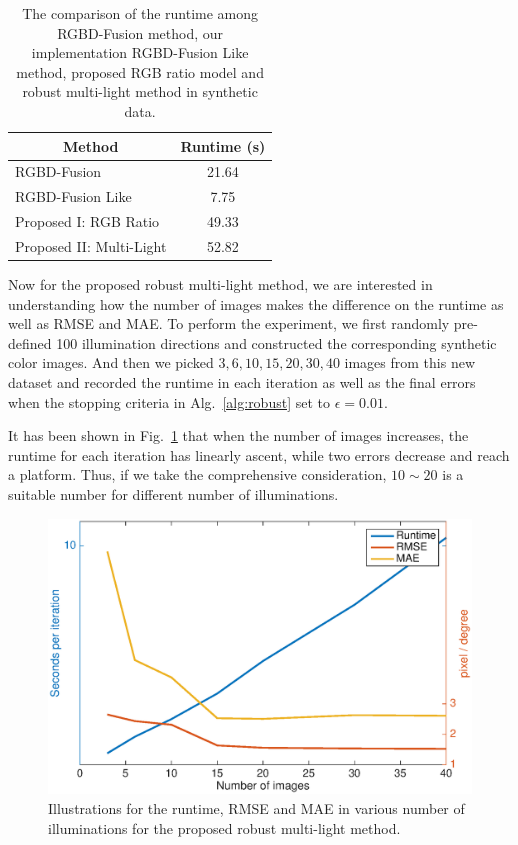 \begin{table}[!ht]
\caption{The comparison of the runtime among RGBD-Fusion method, our implementation RGBD-Fusion Like method,  proposed RGB ratio model and robust multi-light method in synthetic data.}
\label{tab:runtime}
\centering
\begin{tabular}{|m{4cm} |m{7cm}|}
\hline
\multicolumn{1}{|c|}{Method}                               & \multicolumn{1}{c|}{Runtime (s)}                                                                                                                 \\ \hline
RGBD-Fusion~\cite{or2015rgbd} & \multicolumn{1}{c|}{21.64}             \\ \hline
RGBD-Fusion Like                     & \multicolumn{1}{c|}{7.75}      \\ \hline
Proposed I: RGB Ratio                            & \multicolumn{1}{c|}{49.33}        \\ \hline
Proposed II: Multi-Light                        & \multicolumn{1}{c|}{52.82}\\ \hline
\end{tabular}
\end{table}

Now for the proposed robust multi-light method, we are interested in understanding how the number of  images makes the difference on the runtime as well as RMSE and MAE.
To perform the experiment, we first randomly pre-defined 100 illumination directions and constructed the corresponding synthetic color images.
And then we picked $3,6,10,15,20,30, 40$ images from this new dataset and recorded the runtime in each iteration as well as the final errors when the stopping criteria in Alg.~\ref{alg:robust} set to $\epsilon = 0.01$.

It has been shown in Fig.~\ref{fig:result_runtime} that when the number of images increases, the runtime for each iteration has linearly ascent, while two errors decrease and reach a platform.
Thus, if we take the comprehensive consideration, $10\sim20$ is a suitable number for different number of illuminations.

\begin{figure}[!ht]
    \centering
    \includegraphics[height = 0.6\linewidth]{figures/result/runtime.eps} 
    \caption{Illustrations for the runtime, RMSE and MAE in various number of illuminations for the proposed robust multi-light method.}
\label{fig:result_runtime}
\end{figure}


